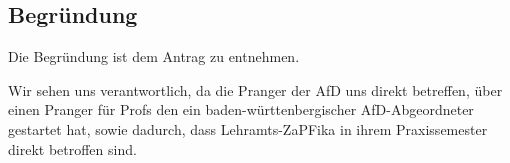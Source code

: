 \documentclass[draft,10pt,oneside]{scrartcl}
\begin{document}
\subsection*{Begründung}

Die Begründung ist dem Antrag zu entnehmen.

Wir sehen uns verantwortlich, da die Pranger der AfD uns direkt betreffen, über
einen Pranger für Profs den ein baden-württenbergischer AfD-Abgeordneter
gestartet hat, sowie dadurch, dass Lehramts-ZaPFika in ihrem Praxissemester
direkt betroffen sind.
\end{document}
